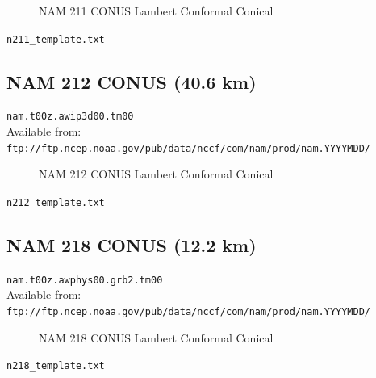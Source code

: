 \documentclass[11pt]{article}   %
\begin{document}
\begin{figure}[htbp]\begin{center}
\parbox{15cm}{\caption{\label{FigNAM211}
NAM 211 CONUS Lambert Conformal Conical
}}
\end{center}\end{figure}
\clearpage
\verb|n211_template.txt| \\
\tiny  \normalsize

\clearpage
\subsection{NAM 212 CONUS (40.6 km)}

\verb|nam.t00z.awip3d00.tm00|\\
Available from:\\
\verb|ftp://ftp.ncep.noaa.gov/pub/data/nccf/com/nam/prod/nam.YYYYMDD/|

\begin{figure}[htbp]\begin{center}
\parbox{15cm}{\caption{\label{FigNAM212}
NAM 212 CONUS Lambert Conformal Conical
}}
\end{center}\end{figure}
\clearpage
\verb|n212_template.txt| \\
\tiny  \normalsize

\clearpage
\subsection{NAM 218 CONUS (12.2 km)}

\verb|nam.t00z.awphys00.grb2.tm00|\\
Available from:\\
\verb|ftp://ftp.ncep.noaa.gov/pub/data/nccf/com/nam/prod/nam.YYYYMDD/|

\begin{figure}[htbp]\begin{center}
\parbox{15cm}{\caption{\label{FigNAM218}
NAM 218 CONUS Lambert Conformal Conical
}}
\end{center}\end{figure}
\clearpage
\verb|n218_template.txt| \\
\tiny  \normalsize
\end{document}
